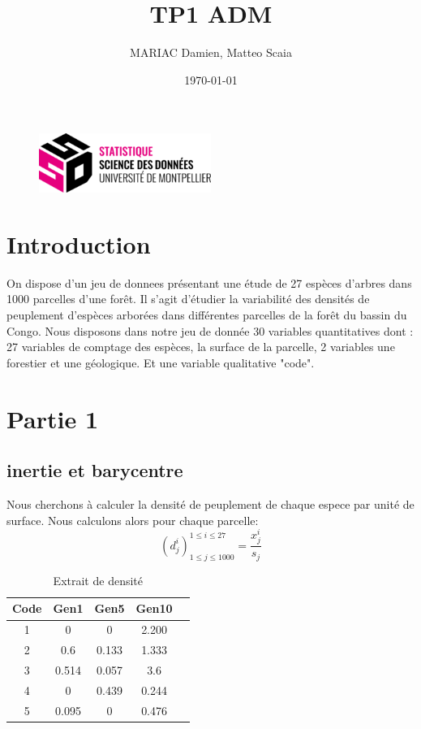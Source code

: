 \documentclass{article}
\title{TP1 ADM}
\author{MARIAC Damien, Matteo Scaia}
\date{\today}
\begin{document}
\maketitle

\begin{figure}[h] 
    \centering
    \includegraphics[width=0.5\textwidth]{ssd_logo.png} 
\end{figure}

\newpage
\tableofcontents
\newpage

\section{Introduction}
On dispose d'un jeu de donnees présentant une étude de 27 espèces d'arbres dans 1000 parcelles d'une forêt.
Il s'agit d'étudier la variabilité des densités de peuplement d'espèces arborées dans différentes parcelles de la forêt du bassin du Congo.
Nous disposons dans notre jeu de donnée 30 variables quantitatives dont : 27 variables de comptage des espèces, la surface de la parcelle, 2 variables une forestier et une géologique.
Et une variable qualitative "code".

\section{Partie 1}
\subsection{inertie et barycentre}

Nous cherchons à calculer la densité de peuplement de chaque espece par unité de surface. Nous calculons alors pour chaque parcelle:
\[
(d_j^i)_{1 \leq j \leq 1000}^{1 \leq i \leq 27} = \frac{x_j^i}{s_j}
\]

\begin{table}[h]
    \centering
    \caption{Extrait de densité}
    \label{tab:donnees_extrait}
    \begin{tabular}{|c|c|c|c|c|}
    \hline
    \textbf{Code} & \textbf{Gen1} & \textbf{Gen5} & \textbf{Gen10}\\
    \hline
    1 & 0 & 0 & 2.200 \\
    2 & 0.6 & 0.133 & 1.333  \\
    3 & 0.514 & 0.057 & 3.6 \\
    4 & 0 & 0.439 & 0.244 \\
    5 & 0.095 & 0 & 0.476 \\
    \hline
    \end{tabular}
    \end{table}
\end{document}
